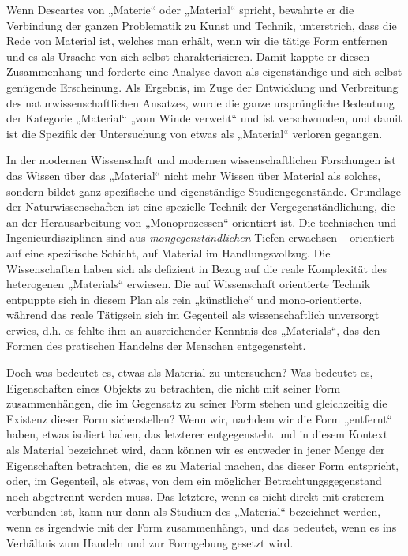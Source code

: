 \documentclass[11pt,a4paper]{article}
\begin{document}
Wenn Descartes von „Materie“ oder „Material“ spricht, bewahrte er die
Verbindung der ganzen Problematik zu Kunst und Technik, unterstrich, dass die
Rede von Material ist, welches man erhält, wenn wir die tätige Form entfernen
und es als Ursache von sich selbst charakterisieren. Damit kappte er diesen
Zusammenhang und forderte eine Analyse davon als eigenständige und sich selbst
genügende Erscheinung. Als Ergebnis, im Zuge der Entwicklung und Verbreitung
des naturwissenschaftlichen Ansatzes, wurde die ganze ursprüngliche Bedeutung
der Kategorie „Material“ „vom Winde verweht“ und ist verschwunden, und damit
ist die Spezifik der Untersuchung von etwas als „Material“ verloren gegangen.

In der modernen Wissenschaft und modernen wissenschaftlichen Forschungen ist
das Wissen über das „Material“ nicht mehr Wissen über Material als solches,
sondern bildet ganz spezifische und eigenständige Studiengegenstände.
Grundlage der Naturwissenschaften ist eine spezielle Technik der
Vergegenständlichung, die an der Herausarbeitung von „Monoprozessen“
orientiert ist. Die technischen und Ingenieurdisziplinen sind aus
\emph{mongegenständlichen} Tiefen erwachsen -- orientiert auf eine spezifische
Schicht, auf Material im Handlungsvollzug. Die Wissenschaften haben sich als
defizient in Bezug auf die reale Komplexität des heterogenen „Materials“
erwiesen. Die auf Wissenschaft orientierte Technik entpuppte sich in diesem
Plan als rein „künstliche“ und mono-orientierte, während das reale Tätigsein
sich im Gegenteil als wissenschaftlich unversorgt erwies, d.h. es fehlte ihm
an ausreichender Kenntnis des „Materials“, das den Formen des pratischen
Handelns der Menschen entgegensteht.

Doch was bedeutet es, etwas als Material zu untersuchen? Was bedeutet es,
Eigenschaften eines Objekts zu betrachten, die nicht mit seiner Form
zusammenhängen, die im Gegensatz zu seiner Form stehen und gleichzeitig die
Existenz dieser Form sicherstellen? Wenn wir, nachdem wir die Form „entfernt“
haben, etwas isoliert haben, das letzterer entgegensteht und in diesem Kontext
als Material bezeichnet wird, dann können wir es entweder in jener Menge der
Eigenschaften betrachten, die es zu Material machen, das dieser Form
entspricht, oder, im Gegenteil, als etwas, von dem ein möglicher
Betrachtungsgegenstand noch abgetrennt werden muss.  Das letztere, wenn es
nicht direkt mit ersterem verbunden ist, kann nur dann als Studium des
„Material“ bezeichnet werden, wenn es irgendwie mit der Form zusammenhängt,
und das bedeutet, wenn es ins Verhältnis zum Handeln und zur Formgebung
gesetzt wird.
\end{document}
